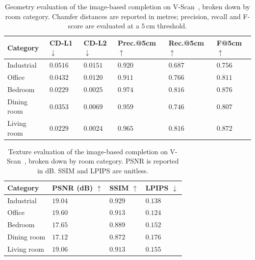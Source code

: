 \begin{table}[h]
    \centering
    \caption[Geometry evaluation of the image-based completion on V-Scan]{Geometry evaluation of the image-based completion on V-Scan~\cite{vermandere_synthetic_2026}, broken down by room category. Chamfer distances are reported in metres; precision, recall and F-score are evaluated at a $5$\,cm threshold.}
    \label{tab:7_vscan_geom}
    \begin{tabularx}{\textwidth}{l >{\centering\arraybackslash}X >{\centering\arraybackslash}X >{\centering\arraybackslash}X >{\centering\arraybackslash}X >{\centering\arraybackslash}X}
        \toprule
        \textbf{Category} & \textbf{CD-L1 $\downarrow$} & \textbf{CD-L2 $\downarrow$} & \textbf{Prec.@5cm $\uparrow$} & \textbf{Rec.@5cm $\uparrow$} & \textbf{F@5cm $\uparrow$} \\
        \midrule
        Industrial   & $0.0516$ & $0.0151$ & $0.920$ & $0.687$ & $0.756$ \\
        Office       & $0.0432$ & $0.0120$ & $0.911$ & $0.766$ & $0.811$ \\
        Bedroom      & $0.0229$ & $0.0025$ & $0.974$ & $0.816$ & $0.876$ \\
        Dining room  & $0.0353$ & $0.0069$ & $0.959$ & $0.746$ & $0.807$ \\
        Living room  & $0.0229$ & $0.0024$ & $0.965$ & $0.816$ & $0.872$ \\
        \bottomrule
    \end{tabularx}
\end{table}

\begin{table}[h]
    \centering
    \caption[Texture evaluation of the image-based completion on V-Scan]{Texture evaluation of the image-based completion on V-Scan~\cite{vermandere_synthetic_2026}, broken down by room category. PSNR is reported in dB. SSIM and LPIPS are unitless.}
    \label{tab:7_vscan_tex}
    \begin{tabularx}{\textwidth}{l >{\centering\arraybackslash}X >{\centering\arraybackslash}X >{\centering\arraybackslash}X}
        \toprule
        \textbf{Category} & \textbf{PSNR (dB) $\uparrow$} & \textbf{SSIM $\uparrow$} & \textbf{LPIPS $\downarrow$} \\
        \midrule
        Industrial   & $19.04$ & $0.929$ & $0.138$ \\
        Office       & $19.60$ & $0.913$ & $0.124$ \\
        Bedroom      & $17.65$ & $0.889$ & $0.152$ \\
        Dining room  & $17.12$ & $0.872$ & $0.176$ \\
        Living room  & $19.06$ & $0.913$ & $0.155$ \\
        \bottomrule
    \end{tabularx}
\end{table}

